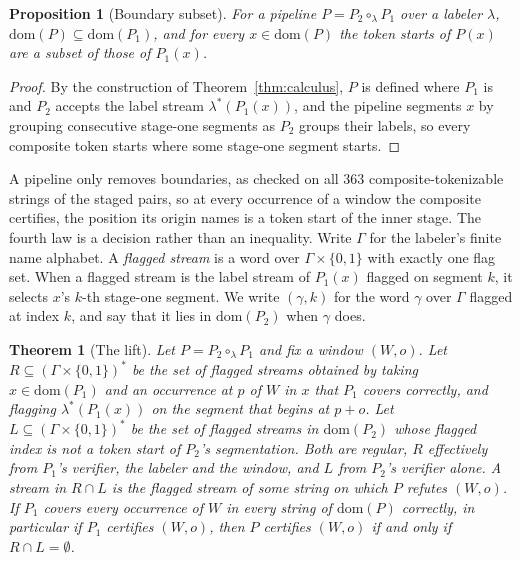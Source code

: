 \documentclass[11pt,a4paper]{article}
\theoremstyle{definition}
\theoremstyle{plain}
\newtheorem{theorem}{Theorem}
\newtheorem{proposition}{Proposition}
\begin{document}
\begin{proposition}[Boundary subset]\label{prop:subset}
For a pipeline $P = P_2 \circ_\lambda P_1$ over a labeler $\lambda$, $\mathrm{dom}(P) \subseteq \mathrm{dom}(P_1)$, and
for every $x \in \mathrm{dom}(P)$ the token starts of $P(x)$ are a subset of those of $P_1(x)$.
\end{proposition}

\begin{proof}
By the construction of Theorem~\ref{thm:calculus}, $P$ is defined where $P_1$ is and $P_2$ accepts the label stream
$\lambda^{*}(P_1(x))$, and the pipeline segments $x$ by grouping consecutive stage-one segments as $P_2$ groups their
labels, so every composite token starts where some stage-one segment starts.
\end{proof}

A pipeline only removes boundaries, as checked on all 363 composite-tokenizable strings of the staged pairs, so at every
occurrence of a window the composite certifies, the position its origin names is a token start of the inner stage. The
fourth law is a decision rather than an inequality. Write $\Gamma$ for the labeler's finite name alphabet. A
\emph{flagged stream} is a word over $\Gamma \times \{0,1\}$ with exactly one flag set. When a flagged stream is the
label stream of $P_1(x)$ flagged on segment $k$, it selects $x$'s $k$-th stage-one segment. We write $(\gamma, k)$ for
the word $\gamma$ over $\Gamma$ flagged at index $k$, and say that it lies in $\mathrm{dom}(P_2)$ when $\gamma$ does.

\begin{theorem}[The lift]\label{thm:lift}
Let $P = P_2 \circ_\lambda P_1$ and fix a window $(W,o)$. Let $R \subseteq (\Gamma \times \{0,1\})^{*}$ be the set of
flagged streams obtained by taking $x \in \mathrm{dom}(P_1)$ and an occurrence at $p$ of $W$ in $x$ that $P_1$ covers
correctly, and flagging $\lambda^{*}(P_1(x))$ on the segment that begins at $p+o$. Let
$L \subseteq (\Gamma \times \{0,1\})^{*}$ be the set of flagged streams in $\mathrm{dom}(P_2)$ whose flagged index is
not a token start of $P_2$'s segmentation. Both are regular, $R$ effectively from $P_1$'s verifier, the labeler and the
window, and $L$ from $P_2$'s verifier alone. A stream in $R \cap L$ is the flagged stream of some string on which $P$
refutes $(W,o)$. If $P_1$ covers every occurrence of $W$ in every string of $\mathrm{dom}(P)$ correctly, in particular
if $P_1$ certifies $(W,o)$, then $P$ certifies $(W,o)$ if and only if $R \cap L = \emptyset$.
\end{theorem}
\end{document}
